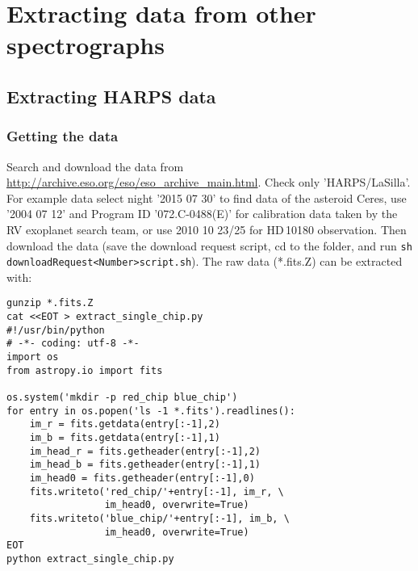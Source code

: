 \documentclass[10pt,a4paper]{article}
\begin{document}





\newpage
\section{Extracting data from other spectrographs}

\subsection{Extracting HARPS data}

\subsubsection{Getting the data}
Search and download the data from \url{http://archive.eso.org/eso/eso_archive_main.html}. Check only 'HARPS/LaSilla'. For example data select night '2015 07 30' to find data of the asteroid Ceres, use '2004 07 12' and Program ID '072.C-0488(E)' for calibration data taken by the RV exoplanet search team, or use 2010 10 23/25 for HD\,10180 observation. Then download the data (save the download request script, cd to the folder, and run \verb|sh  downloadRequest<Number>script.sh|). The raw data (*.fits.Z) can be extracted with:
\begin{lstlisting}[style=base]
gunzip *.fits.Z
cat <<EOT > extract_single_chip.py
#!/usr/bin/python
# -*- coding: utf-8 -*-
import os
from astropy.io import fits

os.system('mkdir -p red_chip blue_chip')
for entry in os.popen('ls -1 *.fits').readlines():
    im_r = fits.getdata(entry[:-1],2)
    im_b = fits.getdata(entry[:-1],1)
    im_head_r = fits.getheader(entry[:-1],2)
    im_head_b = fits.getheader(entry[:-1],1)
    im_head0 = fits.getheader(entry[:-1],0)
    fits.writeto('red_chip/'+entry[:-1], im_r, \
                 im_head0, overwrite=True)
    fits.writeto('blue_chip/'+entry[:-1], im_b, \
                 im_head0, overwrite=True)
EOT
python extract_single_chip.py
\end{lstlisting}
\end{document}
